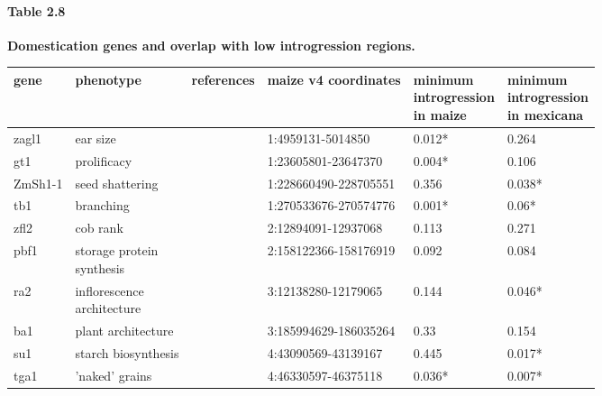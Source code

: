 \begin{sidewaystable}[ht]

\paragraph*{Table 2.8}
\label{genes_outliers}
{\bf Domestication genes and overlap with low introgression regions.}
\newline
\\
\centering
\begin{tabular}{llllll}
  \hline
gene & phenotype & references & maize v4 coordinates & \makecell[bl]{minimum\\ introgression
\\ in maize} & \makecell[tl]{minimum\\ introgression\\
 in mexicana} \\ 
  \hline
zagl1 & ear size & \cite{Wills:2018_zagl1} & 1:4959131-5014850 & 0.012* & 0.264 \\ 
  gt1 & prolificacy & \cite{Wills:2013_gt1} & 1:23605801-23647370 & 0.004* & 0.106 \\ 
  ZmSh1-1 & seed shattering & \cite{Lin:2012_shattering} & 1:228660490-228705551 & 0.356 & 0.038* \\ 
  tb1 & branching & \cite{Doebley_Stec_Gustus:1995_tb1, Doebley_Stec_Hubbard:1997_tb1, Dong:2019_reg_domestication} & 1:270533676-270574776 & 0.001* & 0.06* \\ 
  zfl2 & cob rank  & \cite{Doebley_Stec:1991, Doebley_Stec:1993, Bomblies_Doebley:2006} & 2:12894091-12937068 & 0.113 & 0.271 \\ 
  pbf1 & \makecell[tl]{storage protein\\ synthesis} & \cite{Wang:1998_pbf} & 2:158122366-158176919 & 0.092 & 0.084 \\ 
  ra2 & \makecell[tl]{inflorescence\\ architecture} & \cite{Vollbrecht:2005_ramosa} & 3:12138280-12179065 & 0.144 & 0.046* \\ 
  ba1 & plant architecture & \cite{Gallavotti:2004_ba1} & 3:185994629-186035264 & 0.33 & 0.154 \\ 
  su1 & starch biosynthesis & \cite{Whitt:2002_starch} & 4:43090569-43139167 & 0.445 & 0.017* \\ 
  tga1 & 'naked' grains & \cite{Dorweiler:1993, Wang:2005_tga1} & 4:46330597-46375118 & 0.036* & 0.007* \\ 

\end{tabular}
\end{sidewaystable}
